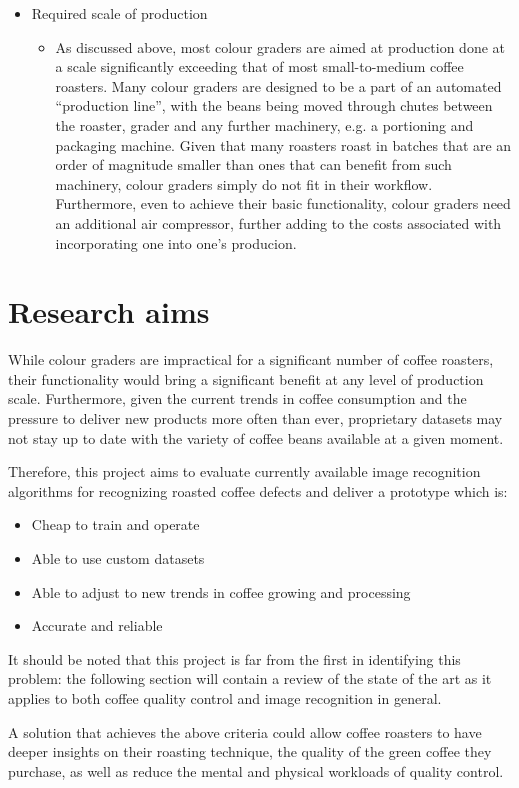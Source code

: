 \begin{itemize}
	\item Required scale of production
		\begin{itemize}
			\item As discussed above, most colour graders are aimed at production done
				at a scale significantly exceeding that of most small-to-medium coffee
				roasters. Many colour graders are designed to be a part of an automated ``production
				line'', with the beans being moved through chutes between the roaster, grader
				and any further machinery, e.g. a portioning and packaging machine.
				Given that many roasters roast in batches that are an order of magnitude
				smaller than ones that can benefit from such machinery, colour graders simply
				do not fit in their workflow. Furthermore, even to achieve their basic functionality,
				colour graders need an additional air compressor, further adding to the costs
				associated with incorporating one into one's producion.
		\end{itemize}
\end{itemize}

\section{Research aims}
\label{sec:research-aims}
While colour graders are impractical for a significant
number of coffee roasters, their functionality would bring a significant benefit
at any level of production scale.
Furthermore, given the current trends in coffee
consumption and the pressure to deliver new products more often than ever,
proprietary datasets may not stay up to date with the variety of coffee beans available at
a given moment.

Therefore, this project aims to evaluate currently available image recognition algorithms
for recognizing roasted coffee defects and deliver a prototype which is:
\begin{itemize}
	\item Cheap to train and operate

	\item Able to use custom datasets

	\item Able to adjust to new trends in coffee growing and processing

	\item Accurate and reliable
\end{itemize}

It should be noted that this project is far from the first in identifying this problem:
the following section will contain a review of the state of the art as it applies to both
coffee quality control and image recognition in general.

A solution that achieves the above criteria could allow coffee roasters to have
deeper insights on their roasting technique, the quality of the green coffee they
purchase, as well as reduce the mental and physical workloads of quality control.